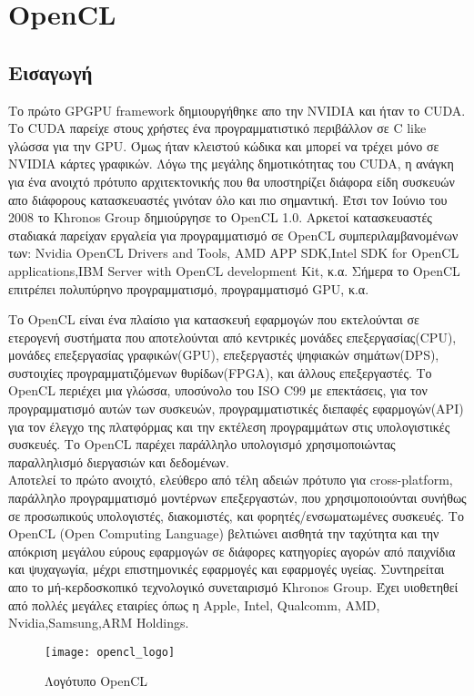 \section{OpenCL}
\subsection{Εισαγωγή}
Το πρώτο GPGPU framework δημιουργήθηκε απο την NVIDIA και ήταν το CUDA. Το CUDA παρείχε στους χρήστες ένα προγραμματιστικό περιβάλλον σε C like γλώσσα για την GPU. Όμως ήταν κλειστού κώδικα και μπορεί να τρέχει μόνο σε NVIDIA κάρτες γραφικών. Λόγω της μεγάλης δημοτικότητας του CUDA, η ανάγκη για ένα ανοιχτό πρότυπο αρχιτεκτονικής που θα υποστηρίζει διάφορα είδη συσκευών απο διάφορους κατασκευαστές γινόταν όλο και πιο σημαντική. Έτσι τον Ιούνιο του 2008 το Khronos Group δημιούργησε το OpenCL 1.0. Αρκετοί κατασκευαστές σταδιακά παρείχαν εργαλεία για προγραμματισμό σε OpenCL συμπεριλαμβανομένων των: Nvidia OpenCL Drivers and Tools, AMD APP SDK,Intel SDK for OpenCL applications,IBM Server with OpenCL development Kit, κ.α. Σήμερα το OpenCL επιτρέπει πολυπύρηνο προγραμματισμό, προγραμματισμό GPU, κ.α.\cite{opencl-1}   

Το OpenCL είναι ένα πλαίσιο για κατασκευή εφαρμογών που εκτελούνται σε ετερογενή συστήματα που αποτελούνται από κεντρικές μονάδες επεξεργασίας(CPU), μονάδες επεξεργασίας γραφικών(GPU), επεξεργαστές ψηφιακών σημάτων(DPS), συστοιχίες προγραμματιζόμενων θυρίδων(FPGA), και άλλους επεξεργαστές. Το OpenCL περιέχει μια γλώσσα, υποσύνολο του ISO C99 με επεκτάσεις, για τον προγραμματισμό αυτών των συσκευών, προγραμματιστικές διεπαφές εφαρμογών(API) για τον έλεγχο της πλατφόρμας και την εκτέλεση προγραμμάτων στις υπολογιστικές συσκευές. Το OpenCL παρέχει παράλληλο υπολογισμό χρησιμοποιώντας παραλληλισμό διεργασιών και δεδομένων.\\
Αποτελεί το πρώτο ανοιχτό, ελεύθερο από τέλη αδειών πρότυπο για cross-platform, παράλληλο προγραμματισμό μοντέρνων επεξεργαστών, που χρησιμοποιούνται συνήθως σε προσωπικούς υπολογιστές, διακομιστές, και φορητές/ενσωματωμένες συσκευές. Το OpenCL (Open Computing Language) βελτιώνει αισθητά την ταχύτητα και την απόκριση μεγάλου εύρους εφαρμογών σε διάφορες κατηγορίες αγορών από παιχνίδια και ψυχαγωγία, μέχρι επιστημονικές εφαρμογές και εφαρμογές υγείας. Συντηρείται απο το μή-κερδοσκοπικό τεχνολογικό συνεταιρισμό Khronos Group. Έχει υιοθετηθεί από πολλές μεγάλες εταιρίες όπως η Apple, Intel, Qualcomm, AMD, Nvidia,Samsung,ARM Holdings.
\begin{figure}[h]
	\texttt{[image: opencl\_logo]}
	\centering
	\caption{Λογότυπο OpenCL}
\end{figure}
